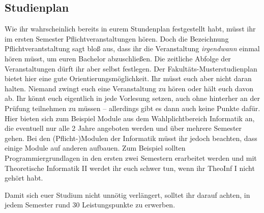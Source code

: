
\subsection{Studienplan}
	\label{bach_studienplan}
	Wie ihr wahrscheinlich bereits in eurem Stundenplan festgestellt habt, müsst ihr im ersten Semester \iftoggle{winter}{vier}{fünf} Pflichtveranstaltungen hören. Doch die Bezeichnung Pflichtverantstaltung sagt bloß aus, dass ihr die Veranstaltung \emph{irgendwann} einmal hören müsst, um euren Bachelor abzuschließen. Die zeitliche Abfolge der Veranstaltungen dürft ihr aber selbst festlegen. Der Fakultäts-Musterstudienplan bietet hier eine gute Orientierungsmöglichkeit. Ihr müsst euch aber nicht daran halten. Niemand zwingt euch eine Veranstaltung zu hören oder hält euch davon ab. Ihr könnt euch eigentlich in jede Vorlesung setzen, auch ohne hinterher an der Prüfung teilnehmen zu müssen -- allerdings gibt es dann auch keine Punkte dafür. Hier bieten sich zum Beispiel Module aus dem Wahlplichtbereich Informatik an, die eventuell nur alle 2 Jahre angeboten werden und über mehrere Semester gehen. Bei den (Pflicht-)Modulen der Informatik müsst ihr jedoch beachten, dass einige Module auf anderen aufbauen. Zum Beispiel sollten Programmiergrundlagen in den ersten zwei Semestern erarbeitet werden und mit Theoretische Informatik II werdet ihr euch schwer tun, wenn ihr TheoInf I nicht gehört habt.

	Damit sich euer Studium nicht unnötig verlängert, solltet ihr darauf achten, in jedem Semester rund 30 Leistungspunkte zu erwerben. 
